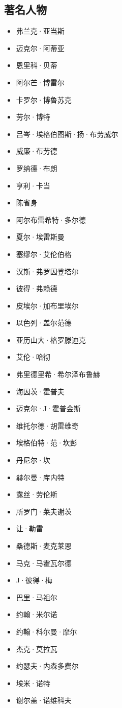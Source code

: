 \subsection{著名人物}
\begin{itemize}
\item 弗兰克·亚当斯
\item 迈克尔·阿蒂亚
\item 恩里科·贝蒂
\item 阿尔芒·博雷尔
\item 卡罗尔·博鲁苏克
\item 劳尔·博特
\item 吕岑·埃格伯图斯·扬·布劳威尔
\item 威廉·布劳德
\item 罗纳德·布朗
\item 亨利·卡当
\item 陈省身
\item 阿尔布雷希特·多尔德
\item 夏尔·埃雷斯曼
\item 塞缪尔·艾伦伯格
\item 汉斯·弗罗因登塔尔
\item 彼得·弗赖德
\item 皮埃尔·加布里埃尔
\item 以色列·盖尔范德
\item 亚历山大·格罗滕迪克
\item 艾伦·哈彻
\item 弗里德里希·希尔泽布鲁赫
\item 海因茨·霍普夫
\item 迈克尔·J·霍普金斯
\item 维托尔德·胡雷维奇
\item 埃格伯特·范·坎彭
\item 丹尼尔·坎
\item 赫尔曼·库内特
\item 露丝·劳伦斯
\item 所罗门·莱夫谢茨
\item 让·勒雷
\item 桑德斯·麦克莱恩
\item 马克·马霍瓦尔德
\item J·彼得·梅
\item 巴里·马祖尔
\item 约翰·米尔诺
\item 约翰·科尔曼·摩尔
\item 杰克·莫拉瓦
\item 约瑟夫·内森多费尔
\item 埃米·诺特
\item 谢尔盖·诺维科夫

\end{itemize}
